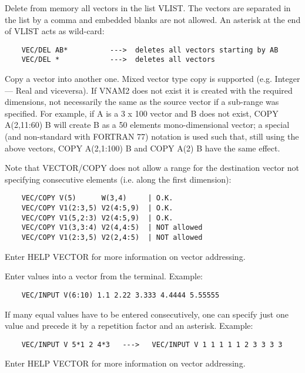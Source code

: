    \par
Delete from memory all vectors in the list VLIST.  The vectors are 
   separated in the list by a comma and embedded blanks are not allowed. An 
   asterisk at the end of VLIST acts as wild-card:  
\begin{verbatim}
    VEC/DEL AB*          --->  deletes all vectors starting by AB
    VEC/DEL *            --->  deletes all vectors
\end{verbatim}

\ENDCMD


\BEGARG
{}
\ENDARG

   \par
Copy a vector into another one.  Mixed vector type copy is supported (e.g. 
   Integer ---\KET{} Real and viceversa).  If VNAM2 does not exist it is 
   created with the required dimensions, not necessarily the same as the 
   source vector if a sub-range was specified.  For example, if A is a 3 x 100 
   vector and B does not exist, COPY A(2,11:60) B will create B as a 50 
   elements mono-dimensional vector; a special (and non-standard with FORTRAN 
   77) notation is used such that, still using the above vectors, COPY 
   A(2,1:100) B and COPY A(2) B have the same effect.  

   \par
Note that VECTOR/COPY does not allow a range for the destination vector not 
   specifying consecutive elements (i.e. along the first dimension):  
\begin{verbatim}
    VEC/COPY V(5)      W(3,4)     | O.K.
    VEC/COPY V1(2:3,5) V2(4:5,9)  | O.K.
    VEC/COPY V1(5,2:3) V2(4:5,9)  | O.K.
    VEC/COPY V1(3,3:4) V2(4,4:5)  | NOT allowed
    VEC/COPY V1(2:3,5) V2(2,4:5)  | NOT allowed
\end{verbatim}
   \par
Enter HELP VECTOR for more information on vector addressing.  

\ENDCMD


\BEGARG
{}
\ENDARG

   \par
Enter values into a vector from the terminal.  Example:  
\begin{verbatim}
    VEC/INPUT V(6:10) 1.1 2.22 3.333 4.4444 5.55555
\end{verbatim}
   \par
If many equal values have to be entered consecutively, one can specify just 
   one value and precede it by a repetition factor and an asterisk. Example:  
\begin{verbatim}
    VEC/INPUT V 5*1 2 4*3   --->   VEC/INPUT V 1 1 1 1 1 2 3 3 3 3
\end{verbatim}
   \par
Enter HELP VECTOR for more information on vector addressing.  

